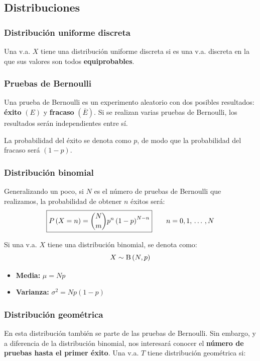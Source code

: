 \documentclass[a4paper]{book}
\begin{document}
\subsection{Distribuciones}

\subsubsection{Distribución uniforme discreta}
Una v.a. $X$ tiene una distribución uniforme discreta si es una v.a. discreta en la que sus valores son todos \textbf{equiprobables}.

\subsubsection{Pruebas de Bernoulli}
Una prueba de Bernoulli es un experimento aleatorio con dos posibles resultados: \textbf{éxito} $(E)$ y \textbf{fracaso} $(\overline{E})$. Si se realizan varias pruebas de Bernoulli, los resultados serán independientes entre sí.

La probabilidad del éxito se denota como $p$, de modo que la probabilidad del fracaso será $(1-p)$.

\subsubsection{Distribución binomial}
Generalizando un poco, si $N$ es el número de pruebas de Bernoulli que realizamos, la probabilidad de obtener $n$ éxitos será: \[\boxed{P\left( X=n \right)={\binom{N}{m}} p^n\left( 1-p \right)^{N-n}} \qquad n= 0,1,\, \ldots \, , N\]

Si una v.a. $X$ tiene una distribución binomial, se denota como: \[X \sim \operatorname{B} \left( N,p \right)\]

\begin{itemize}
	\item \textbf{Media:} $\mu = Np$
	\item \textbf{Varianza:} $\sigma ^2 = Np(1-p)$
\end{itemize}

\subsubsection{Distribución geométrica}
En esta distribución también se parte de las pruebas de Bernoulli. Sin embargo, y a diferencia de la distribución binomial, nos interesará conocer el \textbf{número de pruebas hasta el primer éxito}. Una v.a. $T$ tiene distribución geométrica si:
\end{document}
